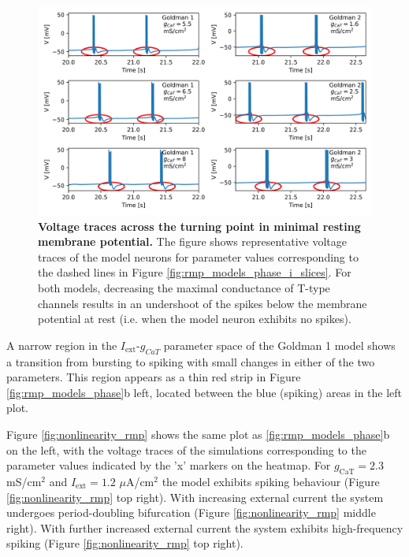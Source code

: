\documentclass[../main.tex]{subfiles}
\begin{document}
\begin{figure}[!t]
    \centering
    \includegraphics[width=\linewidth]{../img/rmp/goldman_1_2_i_slices_vtraces.png}
    \caption[Voltage traces across the turning point in minimal resting membrane potential]{\textbf{Voltage traces across the turning point in minimal resting membrane potential.} The figure shows representative voltage traces of the model neurons for parameter values corresponding to the dashed lines in Figure \ref{fig:rmp_models_phase_i_slices}. For both models, decreasing the maximal conductance of T-type channels results in an undershoot of the spikes below the membrane potential at rest (i.e. when the model neuron exhibits no spikes).}
    \label{fig:rmp_models_phase_i_slices_voltage}
\end{figure}

\vspace*{3mm}

A narrow region in the $I_{\text{ext}}$-$g_{CaT}$ parameter space of the Goldman 1 model shows a transition from bursting to spiking with small changes in either of the two parameters.
This region appears as a thin red strip in Figure \ref{fig:rmp_models_phase}b left, located between the blue (spiking) areas in the left plot.

Figure \ref{fig:nonlinearity_rmp} shows the same plot as \ref{fig:rmp_models_phase}b on the left, with the voltage traces of the simulations corresponding to the parameter values indicated by the 'x' markers on the heatmap. For $g_{\text{CaT}}=2.3$ mS/cm$^2$ and $I_{\text{ext}}=1.2$ $\mu$A/cm$^2$ the model exhibits spiking behaviour (Figure \ref{fig:nonlinearity_rmp} top right). With increasing external current the system undergoes period-doubling bifurcation (Figure \ref{fig:nonlinearity_rmp} middle right). With further increased external current the system exhibits high-frequency spiking (Figure \ref{fig:nonlinearity_rmp} top right).
\end{document}
